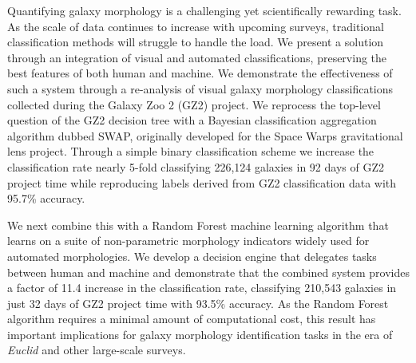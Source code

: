 


Quantifying galaxy morphology is a challenging yet scientifically rewarding task. 
As the scale of data continues to increase with upcoming surveys, traditional 
classification methods will struggle to handle the load. We present a solution 
through an integration of visual and automated classifications, preserving the 
best features of both human and machine. We demonstrate the effectiveness of 
such a system through a re-analysis of visual galaxy morphology classifications 
collected during the Galaxy Zoo 2 (GZ2) project.
We reprocess the top-level question of the GZ2 decision tree
with a Bayesian classification aggregation algorithm dubbed SWAP, originally developed 
for the Space Warps gravitational lens project. 
Through a simple binary classification scheme we increase the classification rate nearly 5-fold classifying 226,124 galaxies in 92 days of GZ2 project time while reproducing labels derived from GZ2 classification data with 95.7\% accuracy.

We next combine this with a Random Forest machine 
learning algorithm that learns on a suite of non-parametric morphology indicators 
widely used for automated morphologies. We develop a decision engine that 
delegates tasks between human and machine and demonstrate that the combined 
system provides a factor of 11.4 increase in the classification rate, classifying 
210,543 galaxies in just 32 days of GZ2 project time with 93.5\% accuracy. As the Random Forest algorithm requires a minimal amount of computational cost, this result has
important implications for galaxy morphology identification tasks in the 
era of \textit{Euclid} and other large-scale surveys.











